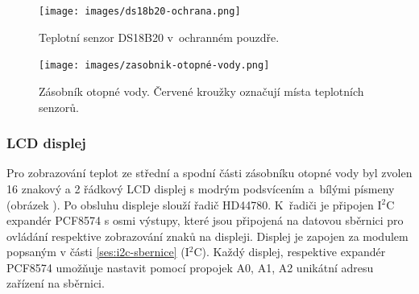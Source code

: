\begin{figure}[H]
    \centering
    \texttt{[image: images/ds18b20-ochrana.png]}
    \caption{Teplotní senzor DS18B20 v~ochranném pouzdře.}
    \label{fig:ds18b20-ochrana}
\end{figure}

\begin{figure}[H]
    \centering
    \texttt{[image: images/zasobnik-otopné-vody.png]}
    \caption[Zásobník otopné vody.]{Zásobník otopné vody. Červené kroužky označují místa teplotních senzorů.}
    \label{fig:zasobnik-otopné-vody}
\end{figure}


\subsubsection{LCD displej}
Pro zobrazování teplot ze střední a spodní části zásobníku otopné vody byl zvolen 16 znakový a 2 řádkový LCD displej s modrým podsvícením a~bílými písmeny (obrázek ). Po obsluhu displeje slouží řadič HD44780. K~řadiči je připojen I$^2$C expandér PCF8574 s osmi výstupy, které jsou připojená na datovou sběrnici pro ovládání respektive zobrazování znaků na displeji. Displej je zapojen za modulem popsaným v části \ref{ses:i2c-sbernice} (I$^2$C). Každý displej, respektive expandér PCF8574 umožňuje nastavit pomocí propojek A0, A1, A2 unikátní adresu zařízení na sběrnici.

